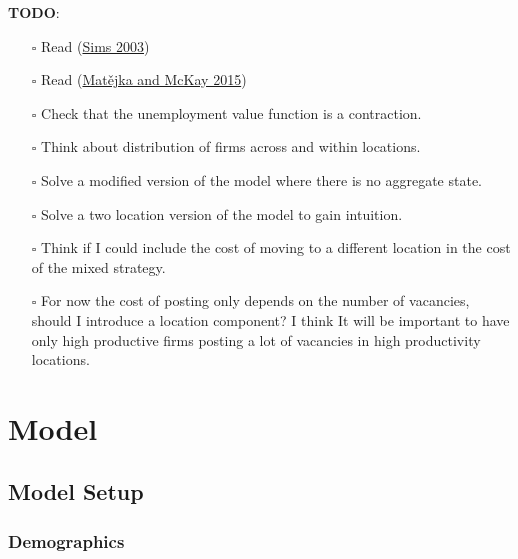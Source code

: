 \documentclass[
  letterpaper,
  DIV=11,
  numbers=noendperiod]{scrreprt}
\providecommand{\tightlist}{%
  \setlength{\itemsep}{0pt}\setlength{\parskip}{0pt}}\usepackage{longtable,booktabs,array}
\begin{document}
\textbf{TODO}:

\begin{itemize}
\tightlist
\item[$\square$]
  Read
  (\protect\hyperlink{ref-simsImplicationsRationalInattention2003}{Sims
  2003})
\item[$\square$]
  Read
  (\protect\hyperlink{ref-matejkaRationalInattentionDiscrete2015}{Matějka
  and McKay 2015})
\item[$\square$]
  Check that the unemployment value function is a contraction.
\item[$\square$]
  Think about distribution of firms across and within locations.
\item[$\square$]
  Solve a modified version of the model where there is no aggregate
  state.
\item[$\square$]
  Solve a two location version of the model to gain intuition.
\item[$\square$]
  Think if I could include the cost of moving to a different location in
  the cost of the mixed strategy.
\item[$\square$]
  For now the cost of posting only depends on the number of vacancies,
  should I introduce a location component? I think It will be important
  to have only high productive firms posting a lot of vacancies in high
  productivity locations.
\end{itemize}


\hypertarget{model}{%
\chapter{Model}\label{model}}

\hypertarget{model-setup}{%
\section{Model Setup}\label{model-setup}}

\hypertarget{demographics}{%
\subsection{Demographics}\label{demographics}}
\end{document}
